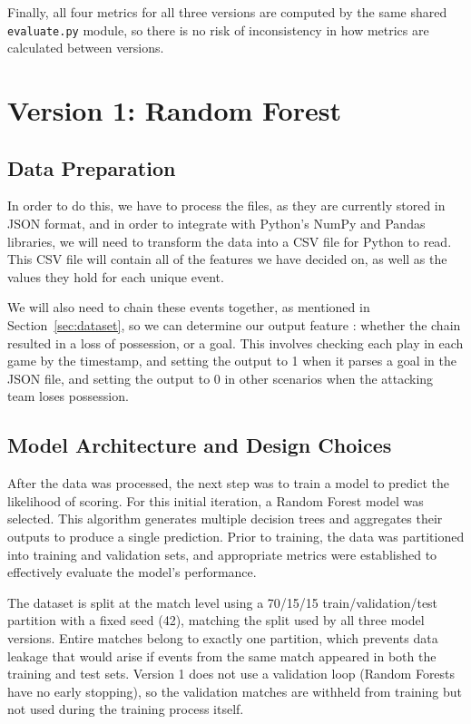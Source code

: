 \documentclass{article}
\begin{document}
Finally, all four metrics for all three versions are computed by the same shared \texttt{evaluate.py} module, so there is no risk of inconsistency in how metrics are calculated between versions.

\section{Version 1: Random Forest}\label{sec:v1}

\subsection{Data Preparation}

In order to do this, we have to process the files, as they are currently stored in JSON format, and in order to integrate with Python's NumPy and Pandas libraries, we will need to transform the data into a CSV file for Python to read. This CSV file will contain all of the features we have decided on, as well as the values they hold for each unique event.

We will also need to chain these events together, as mentioned in Section~\ref{sec:dataset}, so we can determine our output feature : whether the chain resulted in a loss of possession, or a goal. This involves checking each play in each game by the timestamp, and setting the output to 1 when it parses a goal in the JSON file, and setting the output to 0 in other scenarios when the attacking team loses possession.

\subsection{Model Architecture and Design Choices}

After the data was processed, the next step was to train a model to predict the likelihood of scoring. For this initial iteration, a Random Forest model was selected. This algorithm generates multiple decision trees and aggregates their outputs to produce a single prediction. Prior to training, the data was partitioned into training and validation sets, and appropriate metrics were established to effectively evaluate the model's performance.

The dataset is split at the match level using a 70/15/15 train/validation/test partition with a fixed seed (42), matching the split used by all three model versions. Entire matches belong to exactly one partition, which prevents data leakage that would arise if events from the same match appeared in both the training and test sets. Version 1 does not use a validation loop (Random Forests have no early stopping), so the validation matches are withheld from training but not used during the training process itself.
\end{document}
